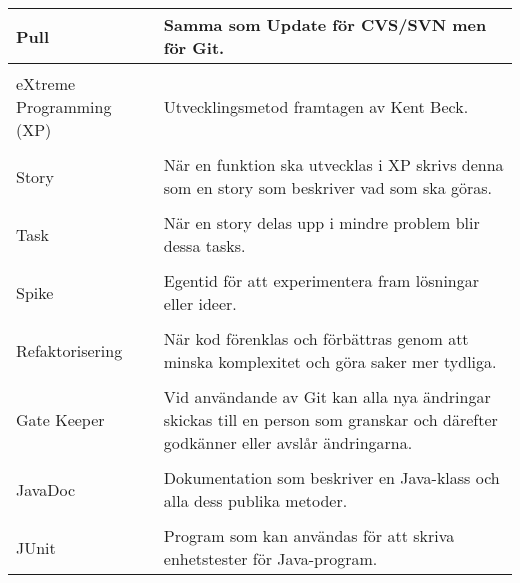 \begin{table}
\begin{tabular}{ | l |  p{7cm} |}
\\Pull	 & Samma som Update för CVS/SVN men för Git. \\ \hline
\\eXtreme Programming (XP) &	Utvecklingsmetod framtagen av Kent Beck. \\ \hline
\\Story &	När en funktion ska utvecklas i XP skrivs denna som en story som beskriver vad som ska göras. \\ \hline
\\Task	& När en story delas upp i mindre problem blir dessa tasks. \\ \hline
\\Spike &	Egentid för att experimentera fram lösningar eller ideer. \\ \hline
\\Refaktorisering &	När kod förenklas och förbättras genom att minska komplexitet och göra saker mer tydliga. \\ \hline
\\Gate Keeper &	Vid användande av Git kan alla nya ändringar skickas till en person som granskar och därefter godkänner eller avslår ändringarna.  \\ \hline
\\JavaDoc &	Dokumentation som beskriver en Java-klass och alla dess publika metoder. \\ \hline
\\JUnit	& Program som kan användas för att skriva enhetstester för Java-program. \\ \hline

\end{tabular}
\end{table}